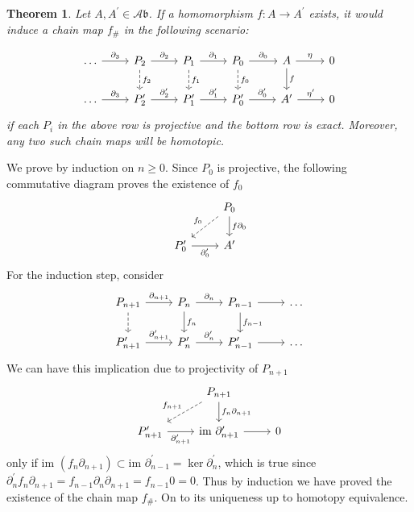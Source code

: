 \documentclass[a4paper,11pt, tikz]{article}
\newcommand{\lb}{\left(}
\newcommand{\rb}{\right)}
\newcommand{\Ab}{\mathcal{A}\mathfrak{b}}
\newcommand{\dash}{^\prime}
\newcommand{\y}{\eta}
\newcommand{\dl}{\partial}
\newcommand{\im}{\text{im~}}
\newcommand{\tends}{\rightarrow}
\newtheorem{thm}{Theorem}
\begin{document}
\begin{thm}
Let $A, A\dash\in\Ab$. If a homomorphism $f:A\tends A\dash$ exists, it would induce a chain map $f_\#$ in the following scenario:

\begin{equation*}
\begin{tikzcd}
\dots\ar[r, "\dl_3"] &P_2\arrow[r, "\dl_2"] \ar[d, dashrightarrow, "f_2"] &P_1\arrow[r, "\dl_1"] \ar[d, dashrightarrow, "f_1"]&P_0\arrow[r, "\dl_0"] \ar[d, dashrightarrow, "f_0"]& A\ar[r, "\y"] \ar[d, "f"]& 0\\
\dots\ar[r, "\dl_3"] &P_2\dash\arrow[r, "\dl_2\dash"]  &P_1\dash\arrow[r, "\dl_1\dash"]&P_0\dash\arrow[r, "\dl_0\dash"] & A\dash\ar[r, "\y\dash"]& 0
\end{tikzcd}
\end{equation*}
if each $P_i$ in the above row is projective and the bottom row is exact. Moreover, any two such chain maps will be homotopic.
\end{thm}
We prove by induction on $n\geq 0$. Since $P_0$ is projective, the following commutative diagram proves the existence of $f_0$
\begin{equation*}
\begin{tikzcd}
& P_0\ar[dl, dashrightarrow, "f_0"'] \ar[d, "f\dl_0"]\\
P_0\dash\ar[r, "\dl_0\dash"']& A\dash
\end{tikzcd}
\end{equation*}
For the induction step, consider
\begin{equation*}
\begin{tikzcd}
P_{n+1}\ar[r, "\dl_{n+1}"]\ar[d, dashrightarrow] & P_n\ar[r, "\dl_n"]\ar[d, "f_n"] & P_{n-1}\ar[r]\ar[d, "f_{n-1}"] & \dots\\
P_{n+1}\dash\ar[r, "\dl_{n+1}\dash"] & P_n\dash\ar[r, "\dl_n\dash"] & P_{n-1}\dash\ar[r] & \dots
\end{tikzcd}
\end{equation*}
We can have this implication due to projectivity of $P_{n+1}$
\begin{equation*}
\begin{tikzcd}
& P_{n+1}\ar[dl, dashrightarrow, "f_{n+1}"']\ar[d, "f_n\dl_{n+1}"]&\\
P_{n+1}\dash\ar[r, "\dl_{n+1}\dash"'] & \im\dl_{n+1}\dash\ar [r] & 0
\end{tikzcd}
\end{equation*}
only if $\im\lb f_n\dl_{n+1}\rb\subset \im \dl_{n-1}\dash=\ker\dl_n\dash$, which is true since $\dl_n\dash f_n\dl_{n+1}=f_{n-1}\dl_n\dl_{n+1}=f_{n-1}0=0$. Thus by induction we have proved the existence of the chain map $f_\#$. On to its uniqueness up to homotopy equivalence.
\end{document}
